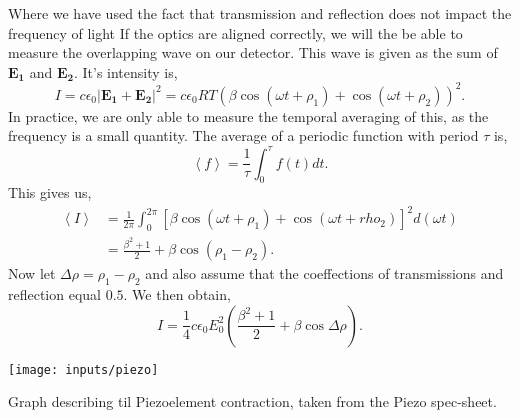 \documentclass[working, oneside]{inputs/tuftebook}
\begin{document}
Where we have used the fact that transmission and reflection does not impact the frequency of light
If the optics are aligned correctly, we will the be able to measure the overlapping wave on our detector. This wave is given as the sum of $\bm{E_1}$ and $\bm{E_2}$. It's intensity is,
\[
I = c\epsilon_0 \left| \bm{E_1}+\bm{E_2} \right| ^2 = c\epsilon_0RT \left(\beta \cos\left( \omega t +\rho_1 \right) +\cos\left( \omega t +\rho_2 \right)   \right)^2
.\] 
In practice, we are only able to measure the temporal averaging of this, as the frequency is a small quantity. The average of a periodic function with period $\tau$ is,
\[
\left<f \right> = \frac{1}{\tau} \int_{0}^{\tau}f\left( t \right) dt  
.\]
This gives us,
\begin{align*}
\left<I \right> &=  \frac{1}{2\pi} \int_{0}^{2\pi} \left[\beta \cos\left( \omega t + \rho_1 \right) + \cos\left( \omega t + rho_2 \right)   \right] ^2 d \left( \omega t \right)  \\
&= \frac{\beta^2 + 1}{2}+ \beta\cos\left( \rho _1 - \rho_2  \right)  
.\end{align*}
Now let $ \Delta \rho = \rho_1 - \rho_2$ and also assume that the coeffections of transmissions and reflection equal $0.5$. We then obtain,
 \[
I = \frac{1}{4}c\epsilon_0 E_0^2 \left( \frac{\beta^2 +1}{2} +\beta \cos \Delta \rho  \right) 
.\]
\begin{marginfigure}
	\centering
	\texttt{[image: inputs/piezo]}
	\caption{Graph describing til Piezoelement contraction, taken from the Piezo spec-sheet.}
	\label{fig:}
\end{marginfigure}
\end{document}
